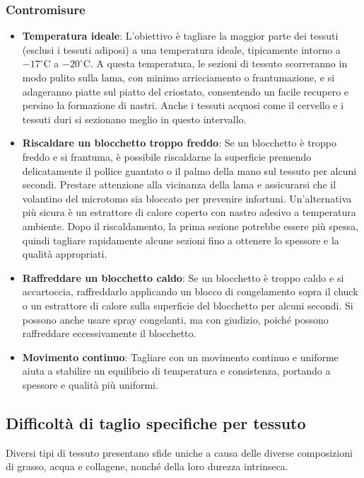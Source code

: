 \subsubsection{Contromisure}
\begin{itemize}
    \item   \textbf{Temperatura ideale}: L'obiettivo è tagliare la maggior parte dei tessuti (esclusi i tessuti adiposi) a una temperatura ideale, tipicamente intorno a $-17^\circ \text{C}$ a $-20^\circ \text{C}$.  A questa temperatura, le sezioni di tessuto scorreranno in modo pulito sulla lama, con minimo arricciamento o frantumazione, e si adageranno piatte sul piatto del criostato, consentendo un facile recupero e persino la formazione di nastri.  Anche i tessuti acquosi come il cervello e i tessuti duri si sezionano meglio in questo intervallo. 
    \item   \textbf{Riscaldare un blocchetto troppo freddo}: Se un blocchetto è troppo freddo e si frantuma, è possibile riscaldarne la superficie premendo delicatamente il pollice guantato o il palmo della mano sul tessuto per alcuni secondi.  Prestare attenzione alla vicinanza della lama e assicurarsi che il volantino del microtomo sia bloccato per prevenire infortuni.  Un'alternativa più sicura è un estrattore di calore coperto con nastro adesivo a temperatura ambiente.  Dopo il riscaldamento, la prima sezione potrebbe essere più spessa, quindi tagliare rapidamente alcune sezioni fino a ottenere lo spessore e la qualità appropriati. 
    \item   \textbf{Raffreddare un blocchetto caldo}: Se un blocchetto è troppo caldo e si accartoccia, raffreddarlo applicando un blocco di congelamento sopra il chuck o un estrattore di calore sulla superficie del blocchetto per alcuni secondi.  Si possono anche usare spray congelanti, ma con giudizio, poiché possono raffreddare eccessivamente il blocchetto. 
    \item   \textbf{Movimento continuo}: Tagliare con un movimento continuo e uniforme aiuta a stabilire un equilibrio di temperatura e consistenza, portando a spessore e qualità più uniformi. 
\end{itemize}

\subsection{Difficoltà di taglio specifiche per tessuto}

Diversi tipi di tessuto presentano sfide uniche a causa delle diverse composizioni di grasso, acqua e collagene, nonché della loro durezza intrinseca. 

